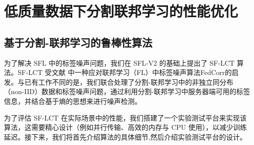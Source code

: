 
\chapter{低质量数据下分割联邦学习的性能优化}
\section{基于分割-联邦学习的鲁棒性算法}
为了解决 SFL 中的标签噪声问题，我们在 SFL-V2 的基础上提出了 SF-LCT 算法。SF-LCT 受文献 \cite{b9} 中一种应对联邦学习（FL）中标签噪声算法FedCorr的启发。与已有工作不同的是，我们联合处理了分割-联邦学习中的非独立同分布（non-IID）数据和标签噪声问题，通过利用分割-联邦学习中服务器端可用的标签信息，并结合基于熵的思想来进行噪声检测。

为了评估 SF-LCT 在实际场景中的性能，我们搭建了一个实验测试平台来实现该算法，这需要精心设计（例如并行传输、高效的内存与 CPU 使用），以减少训练延迟。接下来，我们将首先介绍算法的具体细节,然后介绍实验测试平台的设计。
